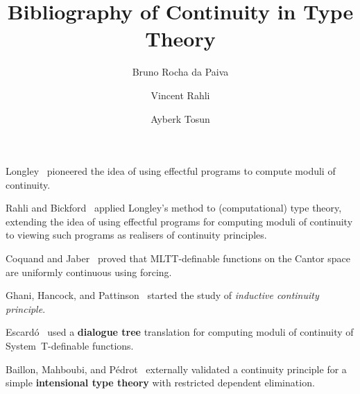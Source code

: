 \documentclass[a4paper]{article}
\title{Bibliography of Continuity in Type Theory}
\author{Bruno Rocha da Paiva \and Vincent Rahli \and Ayberk Tosun}
\begin{document}
\maketitle

Longley~\cite{longley-not-a-functional-program-1999} pioneered the idea of using
effectful programs to compute moduli of continuity.

Rahli and Bickford~\cite{rahli-bickford-mscs-2018} applied Longley's method to
(computational) type theory, extending the idea of using effectful programs
for computing moduli of continuity to viewing such programs as realisers of
continuity principles.

Coquand and Jaber~\cite{coq-jaber-forcing-2012} proved that MLTT-definable
functions on the Cantor space are uniformly continuous using forcing.

Ghani, Hancock, and Pattinson~\cite{ghp-continuous-functions-2006} started the
study of \emph{inductive continuity principle}.

Escard\'o~\cite{mhe-effectful-forcing-2013} used a \textbf{dialogue tree}
translation for computing moduli of continuity of System~T-definable functions.

Baillon, Mahboubi, and P\'edrot~\cite{bmp-pythia-2022} externally validated a
continuity principle for a simple \textbf{intensional type theory} with
restricted dependent elimination.

\newpage
\printbibliography
\end{document}
